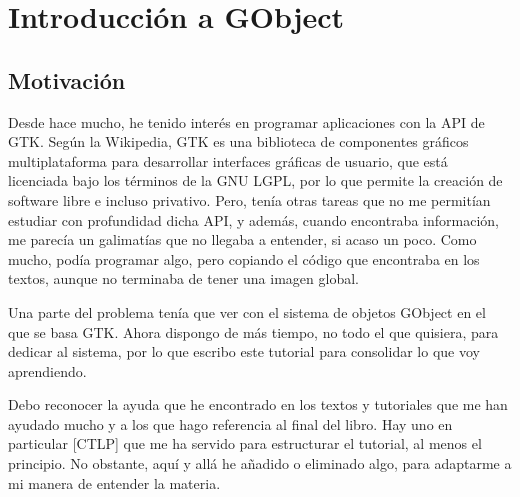 %


\section{Introducción a \textsf{GObject}}

\subsection{Motivación} \label{subsec:motivacion}
Desde hace mucho, he tenido  interés en programar aplicaciones con la API de \textsf{GTK}.
Según la Wikipedia, \textsf{GTK} es una biblioteca de componentes gráficos multiplataforma para desarrollar
interfaces gráficas de usuario, que está licenciada bajo los términos de la GNU LGPL, por lo que
permite la creación de software libre e incluso privativo.
Pero, tenía otras tareas que no me permitían estudiar con profundidad dicha API, y además, cuando
encontraba información, me parecía un galimatías que no llegaba a entender, si acaso un poco.
Como mucho, podía programar algo, pero copiando el código que encontraba en los textos, aunque no
terminaba de tener una imagen global.

Una parte del problema tenía que ver con el sistema de objetos \textsf{GObject} en el que se basa \textsf{GTK}.
Ahora dispongo de más tiempo, no todo el que quisiera,  para dedicar al sistema, por lo que escribo este tutorial  para consolidar lo que voy aprendiendo.

Debo reconocer la ayuda que he encontrado en los textos y tutoriales que me han ayudado mucho y
a los que hago referencia al final del libro. Hay uno en particular [CTLP] que me ha servido para estructurar
el tutorial, al menos el principio. No obstante, aquí y allá he añadido o eliminado algo, para adaptarme a mi manera de entender la materia.
